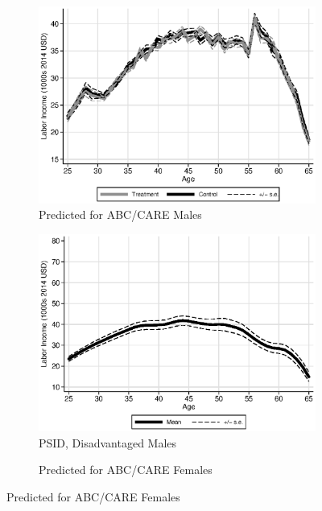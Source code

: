 \begin{figure}
\centering
\caption{Labor Income Profiles, Prediction Based on $X$}\label{fig:labor-income-profiles}
\begin{subfigure}[h]{0.4\textwidth}
		\centering
		\caption{Predicted for ABC/CARE Males} \label{fig:abcare1}
		\includegraphics[width=\textwidth]{output/labor_25-60_male_4.eps}
\end{subfigure}%
\begin{subfigure}[h]{0.4\textwidth}
	\centering
	\caption{PSID, Disadvantaged Males} \label{fig:psid1}
		\includegraphics[width=\textwidth]{output/psid_incomeprofiles_s1.eps}
\end{subfigure}
\begin{subfigure}[h]{0.4\textwidth}
		\centering
		\caption{Predicted for ABC/CARE Females} \label{fig:abcare0}

\end{subfigure}
\end{figure}
